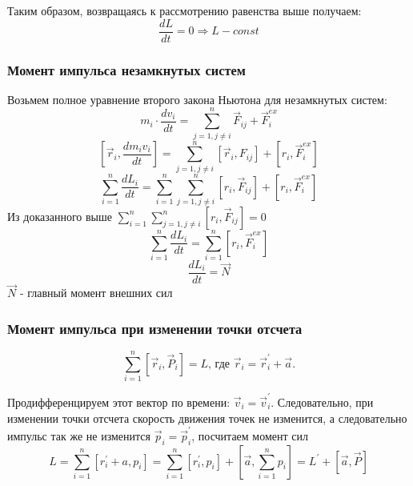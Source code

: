 \documentclass[12pt,a4paper]{report}
\begin{document}
Таким образом, возвращаясь к рассмотрению равенства выше получаем:
\[ \frac{dL}{dt} = 0 \Rightarrow L - const\]
\subsubsection{Момент импульса незамкнутых систем}
Возьмем полное уравнение второго закона Ньютона для незамкнутых систем: \[m_i \cdot \frac{dv_i}{dt} = \sum_{j = 1, j \neq i}^n \vec F_{ij} + \vec F_i ^{ex}\]
\[ [\vec r_i, \frac{dm_iv_i}{dt}] = \sum_{j = 1, j \neq i}^n [\vec r_i, F_{ij}] + [r_i,\vec F_i^{ex}]\]
\[\sum_{i = 1}^n \frac{dL_i}{dt} = \sum_{i = 1}^n \sum_{j = 1, j \neq i}^n [r_i, \vec F_{ij}] + [r_i,\vec F_i^{ex}]\]
Из доказанного выше $\sum_{i = 1}^n \sum_{j = 1, j \neq i}^n [r_i, \vec F_{ij}] = 0$
\[\sum_{i = 1}^n \frac{dL_i}{dt} = \sum_{i = 1}^n [r_i,\vec F_i^{ex}]\]
\[\frac{dL_i}{dt} = \vec N\]
$\vec N$ - главный момент внешних сил
\subsubsection{Момент импульса при изменении точки отсчета}
\begin{center}
\end{center}
\[ \sum_{i = 1}^n [\vec r_i, \vec P_i] = L \text{, где $\vec r_i = \vec r_i^{\prime} + \vec a$.}\]

Продифференцируем этот вектор по времени: $\vec v_i = \vec v_i^{\prime}$. Следовательно, при изменении точки отсчета скорость движения точек не изменится, а следовательно импульс так же не изменится $\vec p_i = \vec p_i^{\prime}$, посчитаем момент сил
\[ L = \sum_{i = 1}^n [r_i^{\prime}+a, p_i] = \sum_{i = 1}^n [r_i^{\prime}, p_i] + [\vec a,\sum_{i = 1}^n p_i] = L^{\prime} + [\vec a, \vec P] \]
\end{document}
